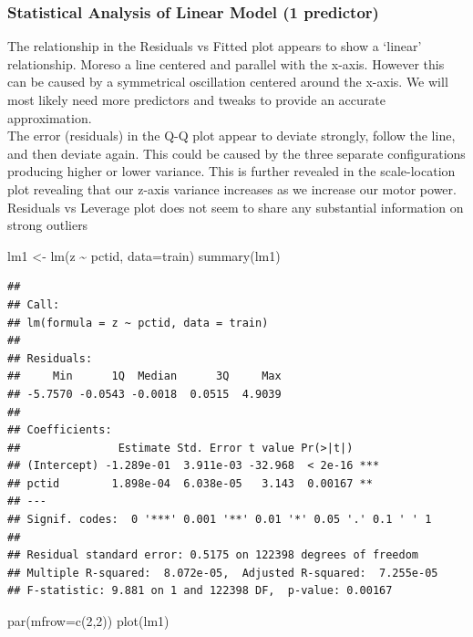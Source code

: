 \documentclass[
]{article}
\newenvironment{Shaded}{\begin{snugshade}}{\end{snugshade}}
\newcommand{\AttributeTok}[1]{\textcolor[rgb]{0.77,0.63,0.00}{#1}}
\newcommand{\DecValTok}[1]{\textcolor[rgb]{0.00,0.00,0.81}{#1}}
\newcommand{\FunctionTok}[1]{\textcolor[rgb]{0.00,0.00,0.00}{#1}}
\newcommand{\NormalTok}[1]{#1}
\newcommand{\OtherTok}[1]{\textcolor[rgb]{0.56,0.35,0.01}{#1}}
\newcommand{\SpecialCharTok}[1]{\textcolor[rgb]{0.00,0.00,0.00}{#1}}
\begin{document}
\hypertarget{statistical-analysis-of-linear-model-1-predictor}{%
\subsubsection{Statistical Analysis of Linear Model (1
predictor)}\label{statistical-analysis-of-linear-model-1-predictor}}

The relationship in the Residuals vs Fitted plot appears to show a
`linear' relationship. Moreso a line centered and parallel with the
x-axis. However this can be caused by a symmetrical oscillation centered
around the x-axis. We will most likely need more predictors and tweaks
to provide an accurate approximation.\\
The error (residuals) in the Q-Q plot appear to deviate strongly, follow
the line, and then deviate again. This could be caused by the three
separate configurations producing higher or lower variance. This is
further revealed in the scale-location plot revealing that our z-axis
variance increases as we increase our motor power. Residuals vs Leverage
plot does not seem to share any substantial information on strong
outliers

\begin{Shaded}
\begin{Highlighting}[]
\NormalTok{lm1 }\OtherTok{\textless{}{-}} \FunctionTok{lm}\NormalTok{(z }\SpecialCharTok{\textasciitilde{}}\NormalTok{ pctid, }\AttributeTok{data=}\NormalTok{train)}
\FunctionTok{summary}\NormalTok{(lm1)}
\end{Highlighting}
\end{Shaded}

\begin{verbatim}
## 
## Call:
## lm(formula = z ~ pctid, data = train)
## 
## Residuals:
##     Min      1Q  Median      3Q     Max 
## -5.7570 -0.0543 -0.0018  0.0515  4.9039 
## 
## Coefficients:
##               Estimate Std. Error t value Pr(>|t|)    
## (Intercept) -1.289e-01  3.911e-03 -32.968  < 2e-16 ***
## pctid        1.898e-04  6.038e-05   3.143  0.00167 ** 
## ---
## Signif. codes:  0 '***' 0.001 '**' 0.01 '*' 0.05 '.' 0.1 ' ' 1
## 
## Residual standard error: 0.5175 on 122398 degrees of freedom
## Multiple R-squared:  8.072e-05,  Adjusted R-squared:  7.255e-05 
## F-statistic: 9.881 on 1 and 122398 DF,  p-value: 0.00167
\end{verbatim}

\begin{Shaded}
\begin{Highlighting}[]
\FunctionTok{par}\NormalTok{(}\AttributeTok{mfrow=}\FunctionTok{c}\NormalTok{(}\DecValTok{2}\NormalTok{,}\DecValTok{2}\NormalTok{))}
\FunctionTok{plot}\NormalTok{(lm1)}
\end{Highlighting}
\end{Shaded}
\end{document}
